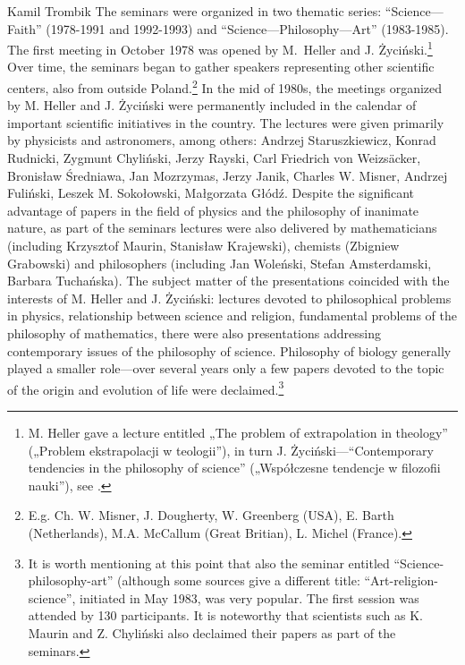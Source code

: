 \begin{artengenv}{Kamil Trombik}
The seminars were organized in two thematic series: ``Science---Faith'' (1978-1991 and 1992-1993) and
``Science---Philosophy---Art'' (1983-1985). The first meeting in October 1978 was opened by M.~Heller and J.
Życiński.\footnote{M. Heller gave a lecture entitled „The problem of extrapolation in theology'' („Problem
ekstrapolacji w teologii''), in turn J. Życiński---``Contemporary tendencies in the philosophy of science'' („Współczesne
tendencje w filozofii nauki''), see
\parencite[p.133]{liana_z_1999}.
} Over time, the seminars
began to gather speakers representing other scientific centers, also from outside Poland.\footnote{E.g. Ch. W. Misner,
J. Dougherty, W. Greenberg (USA), E. Barth (Netherlands), M.A. McCallum (Great Britian), L. Michel (France).} In the
mid of 1980s, the meetings organized by M. Heller and J. Życiński were permanently included in the calendar of
important scientific initiatives in the country. The lectures were given primarily by physicists and astronomers, among
others: Andrzej Staruszkiewicz, Konrad Rudnicki, Zygmunt Chyliński, Jerzy Rayski, Carl Friedrich von
Weizsäcker, Bronisław Średniawa, Jan Mozrzymas,
Jerzy Janik, Charles W. Misner, Andrzej Fuliński, Leszek M. Sokołowski, Małgorzata Głódź. Despite the significant
advantage of papers in the field of physics and the philosophy of inanimate nature, as part of the seminars lectures
were also delivered by mathematicians (including Krzysztof Maurin, Stanisław Krajewski), chemists (Zbigniew Grabowski)
and philosophers (including Jan Woleński, Stefan Amsterdamski, Barbara Tuchańska). The subject matter of the
presentations coincided with the interests of M. Heller and J. Życiński: lectures devoted to philosophical problems in
physics, relationship between science and religion, fundamental problems of the philosophy of mathematics, there were
also presentations addressing contemporary issues of the philosophy of science. Philosophy of biology generally played
a smaller role---over several years only a few papers devoted to the topic of the origin and evolution of life were
declaimed.\footnote{It is worth mentioning at this point that also the seminar entitled ``Science-philosophy-art''
(although some sources give a different title: ``Art-religion-science'', initiated in May 1983, was very popular. The
first session was attended by 130 participants. It is noteworthy that scientists such as K. Maurin and Z. Chyliński
also declaimed their papers as part of the seminars. }


\end{artengenv}
